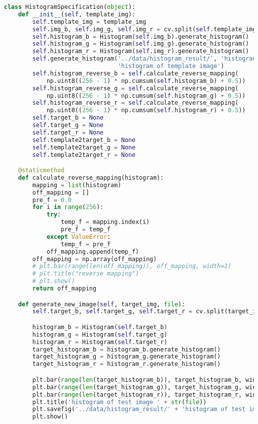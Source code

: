 \documentclass{hitreport}
\begin{document}
\begin{appendices}
\begin{lstlisting}[language=python]
class HistogramSpecification(object):
    def __init__(self, template_img):
        self.template_img = template_img
        self.img_b, self.img_g, self.img_r = cv.split(self.template_img)
        self.histogram_b = Histogram(self.img_b).generate_histogram()
        self.histogram_g = Histogram(self.img_g).generate_histogram()
        self.histogram_r = Histogram(self.img_r).generate_histogram()
        self.generate_histogram('../data/histogram_result/', 'histogram of template image',
                                'histogram of template image')
        self.histogram_reverse_b = self.calculate_reverse_mapping(
            np.uint8((256 - 1) * np.cumsum(self.histogram_b) + 0.5))
        self.histogram_reverse_g = self.calculate_reverse_mapping(
            np.uint8((256 - 1) * np.cumsum(self.histogram_g) + 0.5))
        self.histogram_reverse_r = self.calculate_reverse_mapping(
            np.uint8((256 - 1) * np.cumsum(self.histogram_r) + 0.5))
        self.target_b = None
        self.target_g = None
        self.target_r = None
        self.template2target_b = None
        self.template2target_g = None
        self.template2target_r = None

    @staticmethod
    def calculate_reverse_mapping(histogram):
        mapping = list(histogram)
        off_mapping = []
        pre_f = 0.0
        for i in range(256):
            try:
                temp_f = mapping.index(i)
                pre_f = temp_f
            except ValueError:
                temp_f = pre_f
            off_mapping.append(temp_f)
        off_mapping = np.array(off_mapping)
        # plt.bar(range(len(off_mapping)), off_mapping, width=1)
        # plt.title("reverse mapping")
        # plt.show()
        return off_mapping

    def generate_new_image(self, target_img, file):
        self.target_b, self.target_g, self.target_r = cv.split(target_img)

        histogram_b = Histogram(self.target_b)
        histogram_g = Histogram(self.target_g)
        histogram_r = Histogram(self.target_r)
        target_histogram_b = histogram_b.generate_histogram()
        target_histogram_g = histogram_g.generate_histogram()
        target_histogram_r = histogram_r.generate_histogram()

        plt.bar(range(len(target_histogram_b)), target_histogram_b, width=1, color='b')
        plt.bar(range(len(target_histogram_g)), target_histogram_g, width=1, color='g')
        plt.bar(range(len(target_histogram_r)), target_histogram_r, width=1, color='r')
        plt.title('histogram of test image ' + str(file))
        plt.savefig('../data/histogram_result/' + 'histogram of test image ' + str(file) + '.jpg')
        plt.show()


\end{lstlisting}
\end{appendices}
\end{document}
